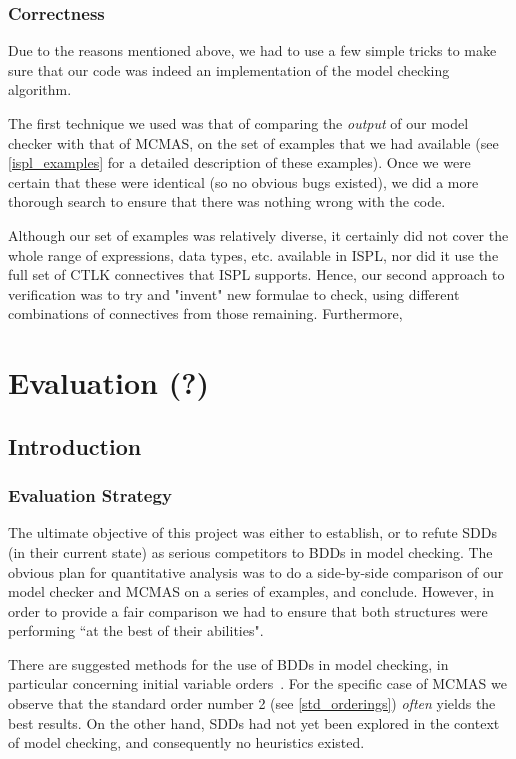 \documentclass[11pt]{article}
\begin{document}
\subsubsection{Correctness}

 Due to the reasons mentioned above, we had to use a few simple tricks to make sure that our code was indeed an implementation of the model checking algorithm. 

The first technique we used was that of comparing the \textit{output} of our model checker with that of MCMAS, on the set of examples that we had available (see \ref{ispl_examples} for a detailed description of these examples). Once we were certain that these were identical (so no obvious bugs existed), we did a more thorough search to ensure that there was nothing wrong with the code. 

Although our set of examples was relatively diverse, it certainly did not cover the whole range of expressions, data types, etc. available in ISPL, nor did it use the full set of CTLK connectives that ISPL supports.
Hence, our second approach to verification was to try and "invent" new formulae to check, using different combinations of connectives from those remaining. Furthermore, 

\section{Evaluation (?)} 

\subsection{Introduction}

\subsubsection{Evaluation Strategy}

The ultimate objective of this project was either to establish, or to refute SDDs (in their current state) as serious competitors to BDDs in model checking. The obvious plan for quantitative analysis was to do a side-by-side comparison of our model checker and MCMAS on a series of examples, and conclude. However, in order to provide a fair comparison we had to ensure that both structures were performing ``at the best of their abilities". 

There are suggested methods for the use of BDDs in model checking, in particular concerning initial variable orders~\cite{bdd_heuristics}. For the specific case of MCMAS we observe that the standard order number 2 (see \ref{std_orderings}) \textit{often} yields the best results.
On the other hand, SDDs had not yet been explored in the context of model checking, and consequently no heuristics existed. 
\end{document}
